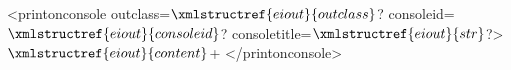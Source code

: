 <printonconsole outclass=$\xmlstructref{eiout}{outclass}$? consoleid=$\xmlstructref{eiout}{consoleid}$? consoletitle=$\xmlstructref{eiout}{str}$?>
  $\xmlstructref{eiout}{content}$+
</printonconsole>
